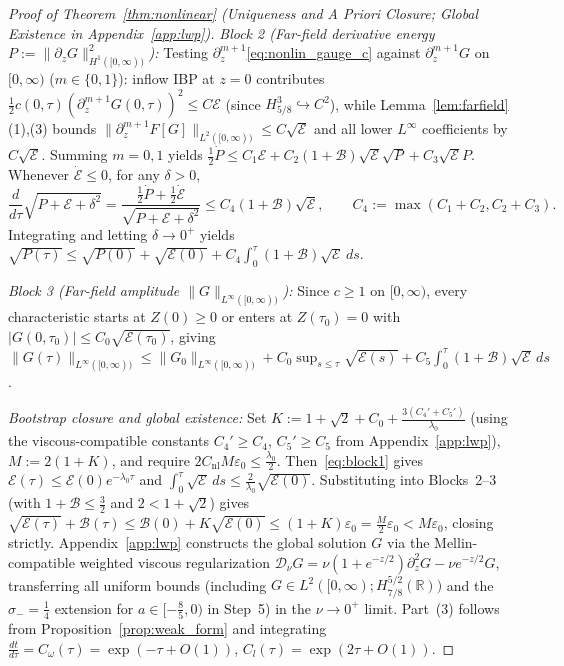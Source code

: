 \documentclass[11pt,a4paper]{article}
\begin{document}
\begin{proof}[Proof of Theorem~\ref{thm:nonlinear} (Uniqueness and \emph{A Priori} Closure; Global Existence in Appendix~\ref{app:lwp})]
\emph{Block 2 (Far-field derivative energy $P := \|\partial_z G\|_{H^1([0,\infty))}^2$):} Testing $\partial_z^{m+1}$\eqref{eq:nonlin_gauge_c} against $\partial_z^{m+1}G$ on $[0,\infty)$ ($m \in \{0,1\}$): inflow IBP at $z=0$ contributes $\frac{1}{2}c(0,\tau)(\partial_z^{m+1}G(0,\tau))^2 \le C\mathcal{E}$ (since $H^3_{5/8} \hookrightarrow C^2$), while Lemma~\ref{lem:farfield}(1),(3) bounds $\|\partial_z^{m+1}F[G]\|_{L^2([0,\infty))} \le C\sqrt{\mathcal{E}}$ and all lower $L^\infty$ coefficients by $C\sqrt{\mathcal{E}}$. Summing $m=0,1$ yields $\frac{1}{2}\dot P \le C_1\mathcal{E} + C_2(1+\mathcal{B})\sqrt{\mathcal{E}}\sqrt{P} + C_3\sqrt{\mathcal{E}}P$. Whenever $\dot{\mathcal{E}} \le 0$, for any $\delta > 0$,
\[
\frac{d}{d\tau}\sqrt{P + \mathcal{E} + \delta^2} = \frac{\frac{1}{2}\dot P + \frac{1}{2}\dot{\mathcal{E}}}{\sqrt{P+\mathcal{E}+\delta^2}} \le C_4(1+\mathcal{B})\sqrt{\mathcal{E}}, \qquad C_4 := \max(C_1+C_2, C_2+C_3).
\]
Integrating and letting $\delta \to 0^+$ yields $\sqrt{P(\tau)} \le \sqrt{P(0)} + \sqrt{\mathcal{E}(0)} + C_4\int_0^\tau(1+\mathcal{B})\sqrt{\mathcal{E}}\,ds$.

\emph{Block 3 (Far-field amplitude $\|G\|_{L^\infty([0,\infty))}$):} Since $c \ge 1$ on $[0,\infty)$, every characteristic starts at $Z(0)\ge 0$ or enters at $Z(\tau_0) = 0$ with $|G(0,\tau_0)| \le C_0\sqrt{\mathcal{E}(\tau_0)}$, giving $\|G(\tau)\|_{L^\infty([0,\infty))} \le \|G_0\|_{L^\infty([0,\infty))} + C_0\sup_{s\le\tau}\sqrt{\mathcal{E}(s)} + C_5\int_0^\tau(1+\mathcal{B})\sqrt{\mathcal{E}}\,ds$.

\emph{Bootstrap closure and global existence:} Set $K := 1 + \sqrt{2} + C_0 + \frac{3(C_4'+C_5')}{\lambda_0}$ (using the viscous-compatible constants $C_4' \ge C_4$, $C_5' \ge C_5$ from Appendix~\ref{app:lwp}), $M := 2(1+K)$, and require $2 C_{\mathrm{nl}}M\varepsilon_0 \le \frac{\lambda_0}{2}$. Then~\eqref{eq:block1} gives $\mathcal{E}(\tau) \le \mathcal{E}(0)e^{-\lambda_0\tau}$ and $\int_0^\tau\sqrt{\mathcal{E}}\,ds \le \frac{2}{\lambda_0}\sqrt{\mathcal{E}(0)}$. Substituting into Blocks~2--3 (with $1+\mathcal{B}\le\frac{3}{2}$ and $2 < 1+\sqrt{2}$) gives $\sqrt{\mathcal{E}(\tau)} + \mathcal{B}(\tau) \le \mathcal{B}(0) + K\sqrt{\mathcal{E}(0)} \le (1+K)\varepsilon_0 = \frac{M}{2}\varepsilon_0 < M\varepsilon_0$, closing strictly. Appendix~\ref{app:lwp} constructs the global solution $G$ via the Mellin-compatible weighted viscous regularization $\mathcal{D}_\nu G = \nu(1+e^{-z/2})\partial_z^2 G - \nu e^{-z/2}G$, transferring all uniform bounds (including $G \in L^2([0,\infty); H^{5/2}_{7/8}(\mathbb{R}))$ and the $\sigma_- = \frac{1}{4}$ extension for $a \in [-\frac{8}{5}, 0)$ in Step~5) in the $\nu \to 0^+$ limit. Part~(3) follows from Proposition~\ref{prop:weak_form} and integrating $\frac{dt}{d\tau} = C_\omega(\tau) = \exp(-\tau + O(1))$, $C_l(\tau) = \exp(2\tau + O(1))$.
\end{proof}
\end{document}
